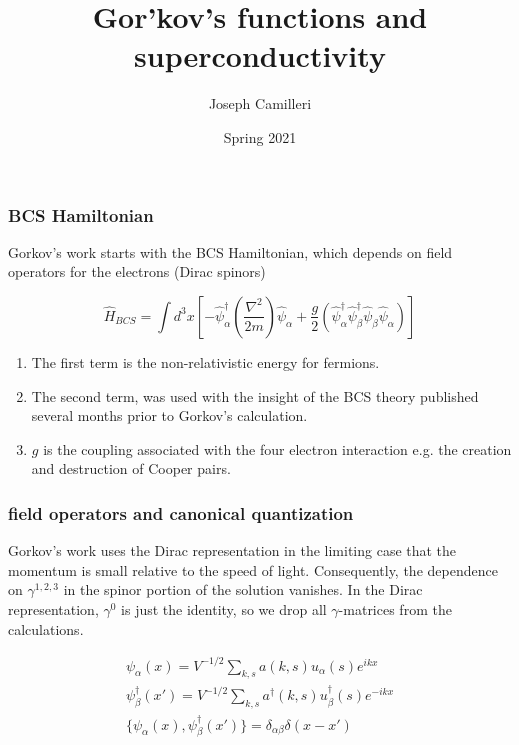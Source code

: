 \documentclass{beamer}
\title{Gor'kov's functions and superconductivity}
\author{Joseph Camilleri}
\institute{Introduction to Quantum Field Theory}
\date{Spring 2021}
\begin{document}
\frame{\titlepage}
\begin{frame}

\frametitle{BCS Hamiltonian}
Gorkov's work starts with the BCS Hamiltonian, which depends on field operators for the electrons (Dirac spinors)

\begin{equation*}
\hat{H}_{BCS} = \int d^3 x \left[ - \hat{\psi}^{\dagger}_{\alpha} \left(\frac{\nabla^2}{2m}\right) \hat{\psi}_{\alpha}  + \frac{g}{2}\left(\hat{\psi}^{\dagger}_{\alpha}\hat{\psi}^{\dagger}_{\beta}\hat{\psi}_{\beta}\hat{\psi}_{\alpha}\right)\right]
\end{equation*}


\begin{enumerate}
\item{The first term is the non-relativistic energy for fermions.}
\item{The second term, was used with the insight of the BCS theory published several months prior to Gorkov's calculation.}
\item{$g$ is the coupling associated with the four electron interaction e.g. the creation and destruction of Cooper pairs.}
\end{enumerate}



\end{frame}


\begin{frame}

\frametitle{field operators and canonical quantization}

Gorkov's work uses the Dirac representation in the limiting case that the momentum is small relative to the speed of light. Consequently, the dependence on $\gamma^{1,2,3}$ in the spinor portion of the solution vanishes. In the Dirac representation, $\gamma^0$ is just the identity, so we drop all $\gamma$-matrices from the calculations.

\begin{eqnarray*}
\psi_{\alpha}(x) = V^{-1/2}\sum_{k,s} a(k,s)u_{\alpha}(s)e^{ikx}\\
\psi_{\beta}^{\dagger}(x') = V^{-1/2}\sum_{k,s} a^{\dagger}(k,s)u_{\beta}^{\dagger}(s)e^{-ikx} \\
\{\psi_{\alpha}(x), \psi_{\beta}^{\dagger}(x')\} = \delta_{\alpha\beta}\delta(x-x')
\end{eqnarray*}



\end{frame}
\end{document}
